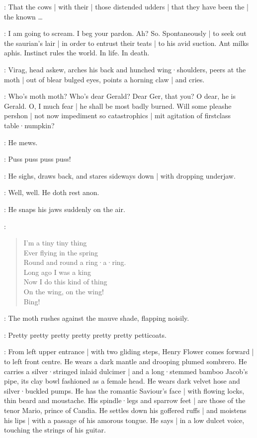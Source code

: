 \Virag:
That the cows |
with their |
those distended udders |
that they have been the |
the known \ldots

\Bloom:
I am going to scream.
I beg your pardon.
Ah?
So.
Spontaneously |
to seek out the saurian's lair |
in order to entrust their teats |
to his avid suction.
Ant milks aphis.
Instinct rules the world.
In life.
In death.

:
Virag,
head askew,
arches his back and hunched wing·shoulders,
peers at the moth |
out of blear bulged eyes,
points a horning claw |
and cries.

\Virag:
Who's moth moth?
Who's dear Gerald?
Dear Ger,
that you?
O dear,
he is Gerald.
O,
I much fear |
he shall be most badly burned.
Will some pleashe pershon |
not now impediment so catastrophics |
mit agitation of firstclass table·numpkin?

:
He mews.

\Virag:
Puss puss puss puss!

:
He sighs,
draws back,
and stares sideways down |
with dropping underjaw.

\Virag:
Well,
well.
He doth rest anon.

:
He snaps his jaws suddenly on the air.

\Moth[2]:
\begin{verse}
    I'm a tiny tiny thing\\
%
    Ever flying in the spring\\
    Round and round a ring·a·ring.\\
    Long ago I was a king\\
    Now I do this kind of thing\\
    On the wing, on the wing!\\
    Bing!
\end{verse}

:
The moth rushes against the mauve shade,
flapping noisily.

\Moth:
Pretty pretty pretty pretty pretty pretty petticoats.

:
From left upper entrance |
with two gliding steps,
Henry Flower comes forward |
to left front centre.
He wears a dark mantle and drooping plumed sombrero.
He carries a silver·stringed inlaid dulcimer |
and a long·stemmed bamboo Jacob's pipe,
its clay bowl fashioned as a female head.
He wears dark velvet hose and silver·buckled pumps.
He has the romantic Saviour's face |
with flowing locks,
thin beard and moustache.
His spindle·legs and sparrow feet |
are those of the tenor Mario,
prince of Candia.
He settles down his goffered ruffs |
and moistens his lips |
with a passage of his amorous tongue.
He says |
in a low dulcet voice,
touching the strings of his guitar.


